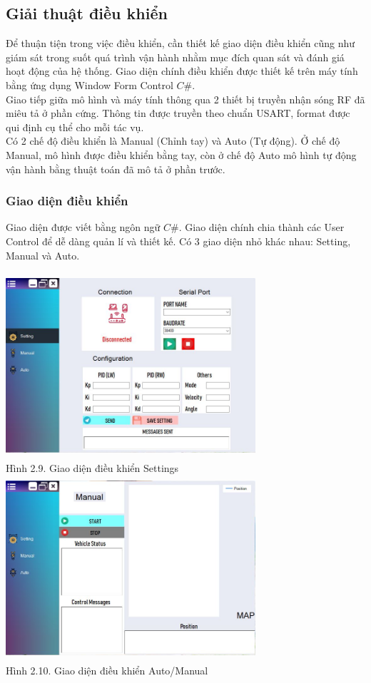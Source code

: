 \documentclass[a4paper, 12pt]{article}
\begin{document}
\subsection{Giải thuật điều khiển}
\hspace{0.5cm}
Để thuận tiện trong việc điều khiển, cần thiết kế giao diện điều khiển cũng như giám sát trong suốt quá trình vận hành nhằm mục đích quan sát và đánh giá hoạt động của hệ thống. Giao diện chính điều khiển được thiết kế trên máy tính bằng ứng dụng Window Form Control $C\#$.\\
\indent
Giao tiếp giữa mô hình và máy tính thông qua 2 thiết bị truyền nhận sóng RF đã miêu tả ở phần cứng. Thông tin được truyền theo chuẩn USART, format được qui định cụ thể cho mỗi tác vụ.\\
\indent
Có 2 chế độ điều khiển là Manual (Chỉnh tay) và Auto (Tự động). Ở chế độ Manual, mô hình được điều khiển bằng tay, còn ở chế độ Auto mô hình tự động vận hành bằng thuật toán đã mô tả ở phần trước.
\subsubsection{Giao diện điều khiển}
Giao diện được viết bằng ngôn ngữ $C\#$. Giao diện chính chia thành các User Control để dễ dàng quản lí và thiết kế. Có 3 giao diện nhỏ khác nhau: Setting, Manual và Auto.
\hspace{0.5cm}
\begin{center}
	\includegraphics[width=350px,height=260px]{images/InterfaceSetting}\\
	Hình 2.9. Giao diện điều khiển Settings\\\vspace{0.5cm}
	\includegraphics[width=350px,height=260px]{images/InterfaceManual}\\
	Hình 2.10. Giao diện điều khiển Auto/Manual
\end{center}
\newpage
\end{document}
